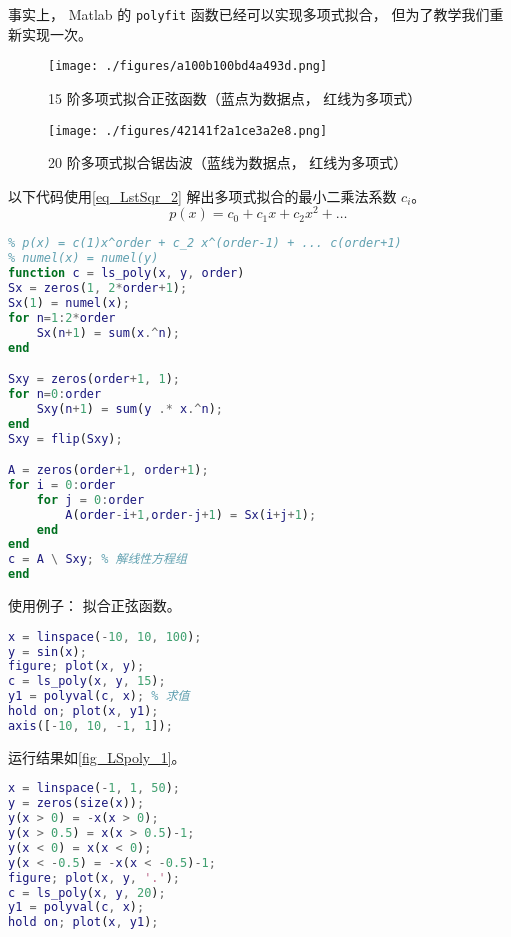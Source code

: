 

事实上， Matlab 的 \verb|polyfit| 函数已经可以实现多项式拟合， 但为了教学我们重新实现一次。
\begin{figure}[ht]
\centering
\texttt{[image: ./figures/a100b100bd4a493d.png]}
\caption{15 阶多项式拟合正弦函数（蓝点为数据点， 红线为多项式）} \label{fig_LSpoly_1}
\end{figure}

\begin{figure}[ht]
\centering
\texttt{[image: ./figures/42141f2a1ce3a2e8.png]}
\caption{20 阶多项式拟合锯齿波（蓝线为数据点， 红线为多项式）} \label{fig_LSpoly_2}
\end{figure}

以下代码使用\autoref{eq_LstSqr_2}  解出多项式拟合的最小二乘法系数 $c_i$。
\begin{equation}
p(x) = c_0 + c_1 x + c_2 x^2 + \dots~
\end{equation}

\begin{lstlisting}[language=matlab, caption=ls\_poly.m]
% 多项式最小二乘法拟合
% p(x) = c(1)x^order + c_2 x^(order-1) + ... c(order+1)
% numel(x) = numel(y)
function c = ls_poly(x, y, order)
Sx = zeros(1, 2*order+1);
Sx(1) = numel(x);
for n=1:2*order
    Sx(n+1) = sum(x.^n);
end

Sxy = zeros(order+1, 1);
for n=0:order
    Sxy(n+1) = sum(y .* x.^n);
end
Sxy = flip(Sxy);

A = zeros(order+1, order+1);
for i = 0:order
    for j = 0:order
        A(order-i+1,order-j+1) = Sx(i+j+1);
    end
end
c = A \ Sxy; % 解线性方程组
end
\end{lstlisting}

使用例子： 拟合正弦函数。
\begin{lstlisting}[language=matlab, caption=ls\_poly\_demo.m]
% ls_poly_demo
x = linspace(-10, 10, 100);
y = sin(x);
figure; plot(x, y);
c = ls_poly(x, y, 15);
y1 = polyval(c, x); % 求值
hold on; plot(x, y1);
axis([-10, 10, -1, 1]);
\end{lstlisting}
运行结果如\autoref{fig_LSpoly_1}。

\begin{lstlisting}[language=matlab, caption=ls\_poly\_demo2.m]
% ls_poly_demo2
x = linspace(-1, 1, 50);
y = zeros(size(x));
y(x > 0) = -x(x > 0);
y(x > 0.5) = x(x > 0.5)-1;
y(x < 0) = x(x < 0);
y(x < -0.5) = -x(x < -0.5)-1;
figure; plot(x, y, '.');
c = ls_poly(x, y, 20);
y1 = polyval(c, x);
hold on; plot(x, y1);
\end{lstlisting}
